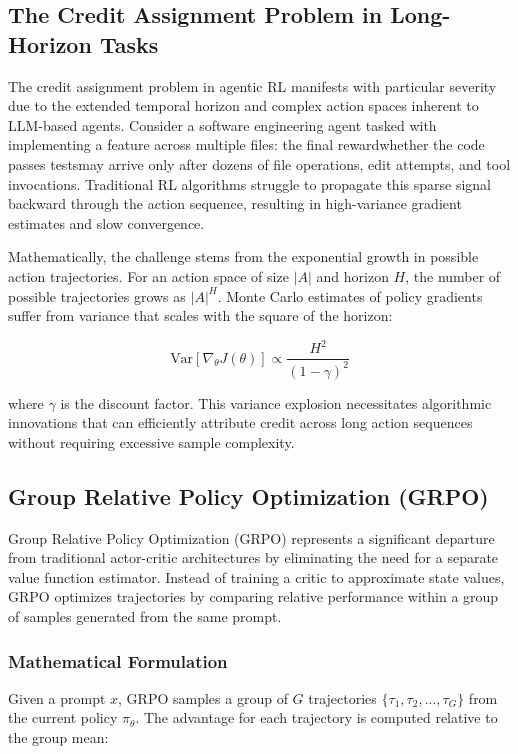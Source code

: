 \subsection{The Credit Assignment Problem in Long-Horizon Tasks}

The credit assignment problem in agentic RL manifests with particular severity due to the extended temporal horizon and complex action spaces inherent to LLM-based agents. Consider a software engineering agent tasked with implementing a feature across multiple files: the final rewardwhether the code passes testsmay arrive only after dozens of file operations, edit attempts, and tool invocations. Traditional RL algorithms struggle to propagate this sparse signal backward through the action sequence, resulting in high-variance gradient estimates and slow convergence.

Mathematically, the challenge stems from the exponential growth in possible action trajectories. For an action space of size $|A|$ and horizon $H$, the number of possible trajectories grows as $|A|^H$. Monte Carlo estimates of policy gradients suffer from variance that scales with the square of the horizon:

$$\text{Var}[\nabla_\theta J(\theta)] \propto \frac{H^2}{(1-\gamma)^2}$$

where $\gamma$ is the discount factor. This variance explosion necessitates algorithmic innovations that can efficiently attribute credit across long action sequences without requiring excessive sample complexity.

\subsection{Group Relative Policy Optimization (GRPO)}

Group Relative Policy Optimization (GRPO) represents a significant departure from traditional actor-critic architectures by eliminating the need for a separate value function estimator. Instead of training a critic to approximate state values, GRPO optimizes trajectories by comparing relative performance within a group of samples generated from the same prompt.

\subsubsection{Mathematical Formulation}

Given a prompt $x$, GRPO samples a group of $G$ trajectories $\{\tau_1, \tau_2, ..., \tau_G\}$ from the current policy $\pi_\theta$. The advantage for each trajectory is computed relative to the group mean:

